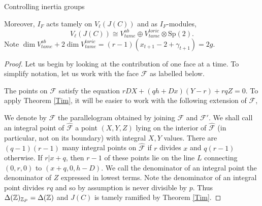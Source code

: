 \documentclass[11pt,a4paper]{article}
\newcommand{\F}{\mathcal{F}}
\begin{document}
\begin{section}{Controlling inertia groups}
\begin{theorem}
 Moreover, $I_F$ acts tamely on $V_\ell(J(C))$ and as $I_F$-modules,
 \[ V_\ell(J(C)) \cong V^{ab}_{tame}\oplus  V^{toric}_{tame} \otimes \mathrm{Sp}(2).
 \]
 Note $\dim V^{ab}_{tame}+ 2\dim V^{toric}_{tame} = (r-1)(x_{t+1}-2+\gamma_{t+1}) = 2g$.




\end{theorem}
\begin{proof}
Let us begin by looking at the contribution of one face at a time. To simplify notation, let us work with the face $\F$ as labelled below.
\begin{center}
\end{center}

The points on $\F$ satisfy the equation $rDX+(qh+Dx)(Y-r)+rqZ = 0 $. To apply Theorem \ref{Tim}, it will be easier to work with the following extension of $\F$,

\begin{center}
\end{center}
We denote by $\hat{\F}$ the parallelogram obtained by joining $\F$ and $\F'$.
We shall call an integral point of $\hat{\F}$ a point $(X,Y,Z)$ lying on the interior of $\hat{\F}$ (in particular, not on its boundary) with integral $X,Y$ values.
There are $(q-1)(r-1)$ many integral points on $\hat{\F}$  if $r$ divides $x$ and $q(r-1)$ otherwise.
If $r|x+q$, then $r-1$ of these points lie on the line $L$ connecting $(0,r,0)$ to $(x+q,0,h-D)$.
We call the denominator of an integral point the denominator of $Z$ expressed in lowest terms.
Note the denominator of an integral point divides $rq$ and so by assumption is never divisible by $p$.
Thus $\Delta(\mathbb{Z})_{\mathbb{Z}_P} = \Delta(\mathbb{Z})$ and $J(C)$ is tamely ramified by Theorem \ref{Tim}.


\end{proof}
\end{section}
\end{document}
